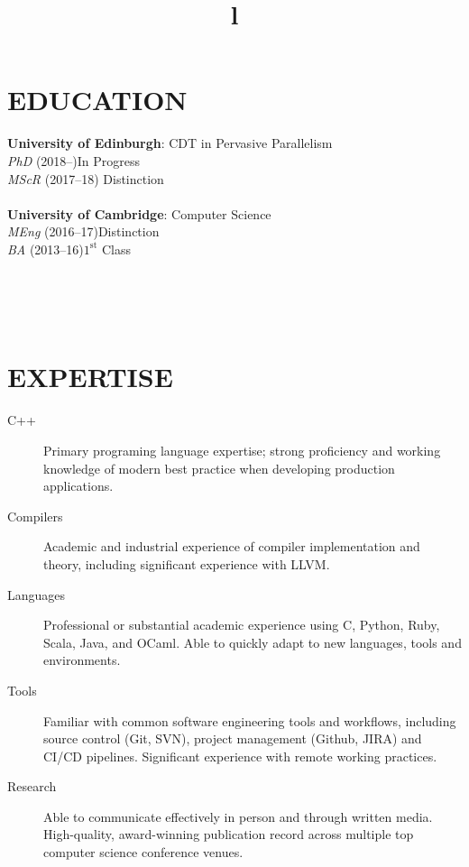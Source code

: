\documentclass[margin]{res}
\begin{document}
\begin{resume}

\section{EDUCATION}
\textbf{University of Edinburgh}: CDT in Pervasive Parallelism \\
{\sl PhD} (2018--)\hfill In Progress
\\
{\sl MScR} (2017--18)\hfill
Distinction \\\\
\textbf{University of Cambridge}: Computer Science \\
{\sl MEng} (2016--17)\hfill Distinction \\
{\sl BA} (2013--16)\hfill $1^{\mathrm{st}}$ Class

\begin{format}
\title{l}\\
\\
\body\\
\end{format}

\section{EXPERTISE}

\begin{description}
  \item[C++] Primary programing language expertise; strong proficiency and
    working knowledge of modern best practice when developing production
    applications.
  \item[Compilers] Academic and industrial experience of compiler
implementation and theory, including significant experience with LLVM.
  \item[Languages] Professional or substantial academic experience using C,
    Python, Ruby, Scala, Java, and OCaml. Able to quickly adapt to new
    languages, tools and environments.
  \item[Tools] Familiar with common software engineering tools and workflows,
    including source control (Git, SVN), project management (Github, JIRA) and
    CI/CD pipelines. Significant experience with remote working practices.
  \item[Research] Able to communicate effectively in person and through written
    media. High-quality, award-winning publication record across multiple top
    computer science conference venues.
\end{description}


\end{resume}
\end{document}
